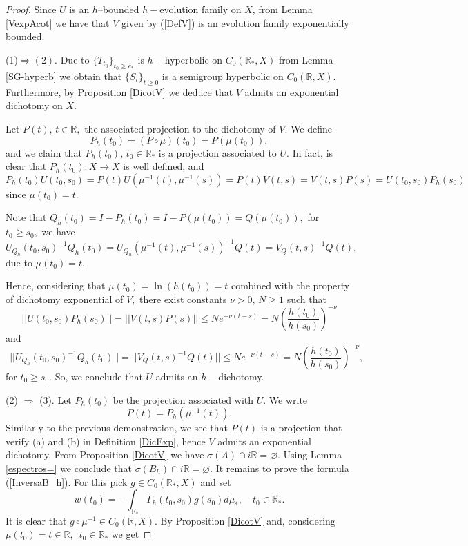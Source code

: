 \documentclass[10pt]{amsart}
\numberwithin{equation}{section}
\begin{document}
\begin{proof}   Since $U$ is  an $h$--bounded $h-$evolution family on $X$, from Lemma \ref{VexpAcot} we have that $V$ given by (\ref{DefV}) is an evolution family exponentially bounded.

\medskip

 (1)$\Rightarrow (2).$  Due to  $\{ T_{t_0}\}_{t_0 \ge e_* }$ is $h-$hyperbolic on $C_0(\mathbb{R}_*,X)$ from Lemma \ref{SG-hyperb} we obtain that $\{S_t\}_{t \ge 0}$ is a semigroup hyperbolic on $C_0(\mathbb{R},X)$. Furthermore, by Proposition \ref{DicotV} we deduce that $V$ admits an exponential dichotomy on $X$.

   Let $P(t), \, t \in \mathbb{R},$ the  associated projection to the dichotomy of $V.$ We define 
   $$
   P_h(t_0) = (P \circ \mu)(t_0) = P(\mu(t_0)), 
   $$
and we claim that $P_h(t_0), \, t_0 \in \mathbb{R}_*$ is a projection associated to  $U$. In fact,  is clear that $P_h(t_0): X \to X$ is well defined, and
\medskip
$$
P_h(t_0) U(t_0, s_0) =  P(t) U(\mu^{-1}(t), \mu^{-1}(s)) = P(t) V(t,s) = V(t,s) P(s) =  U(t_0, s_0) P_h(s_0) $$
since $\mu(t_0) = t.$

\medskip

Note that  $Q_h(t_0) = I - P_h(t_0) = I - P(\mu(t_0)) = Q(\mu(t_0)),$ for $t_0 \ge s_0,$ we have
\medskip
$$U_{Q_h}(t_0,s_0)^{-1}Q_h(t_0) = U_{Q_h}(\mu^{-1}(t), \mu^{-1}(s))^{-1} Q(t) = V_Q(t,s)^{-1}Q(t), 
$$
due to $\mu(t_0) = t.$

Hence, considering that $\mu(t_0) = \ln(h(t_0)) = t$ combined with the property of dichotomy exponential of $V,$ there exist constants $\nu > 0, \,  N\ge 1$ such that
$$
||U(t_0,s_0)P_h(s_0)|| = ||V(t,s)P(s)|| \le N e^{-\nu (t-s)}
= N \left(\frac{h(t_0)}{h(s_0)}\right)^{-\nu} 
$$
and
$$ \ \ ||U_{Q_h}(t_0,s_0)^{-1}Q_h(t_0)|| = ||V_Q(t,s)^{-1}Q(t)|| \le N e^{-\nu (t -s)} =  N \left(\frac{h(t_0)}{h(s_0)}\right)^{-\nu},
$$
for $t_0 \ge s_0.$ So, we conclude that $U$ admits an $h-$dichotomy.

\medskip

(2) $\Rightarrow$ (3). Let $P_h(t_0)$ be the projection associated with $U.$ We write 
$$
P(t) = P_h(\mu^{-1}(t)).
$$
Similarly to the previous demonstration, we see that $P(t)$ is a projection that verify (a) and (b) in Definition \ref{DicExp}, hence $V$ admits an exponential dichotomy. From Proposition \ref{DicotV} we have $\sigma(A) \cap i\mathbb{R} = \varnothing.$  Using Lemma \ref{espectros=} we conclude that $\sigma(B_h) \cap i\mathbb{R} = \varnothing.$  It remains to prove the formula (\ref{InversaB_h}). For this pick $g \in C_{0}(\mathbb{R}_*, X)$ and set 
$$
w(t_0) = - \int_{\mathbb{R}_*} \Gamma_h(t_0,s_0) g(s_0) d\mu_*, \quad t_0 \in \mathbb{R}_*.
$$
It is clear that $g \circ \mu^{-1} \in C_{0}(\mathbb{R}, X).$ By Proposition \ref{DicotV} and, considering $\mu(t_0) = t \in \mathbb{R},$ $ \,  t_0 \in \mathbb{R}_*$ we get


\end{proof}
\end{document}
